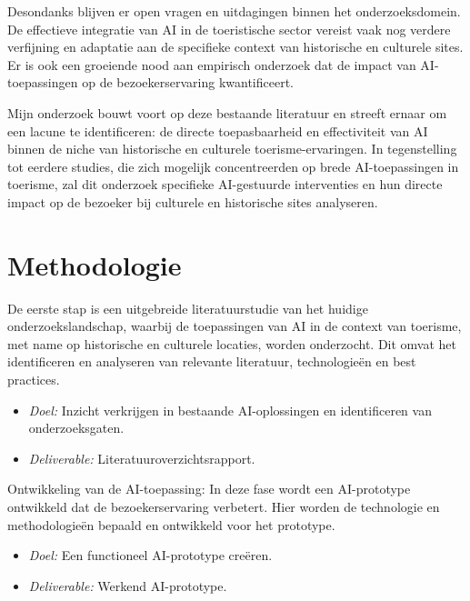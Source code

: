 Desondanks blijven er open vragen en uitdagingen binnen het onderzoeksdomein. De effectieve integratie van AI in de toeristische sector vereist vaak nog verdere verfijning en adaptatie aan de specifieke context van historische en culturele sites. Er is ook een groeiende nood aan empirisch onderzoek dat de impact van AI-toepassingen op de bezoekerservaring kwantificeert.

Mijn onderzoek bouwt voort op deze bestaande literatuur en streeft ernaar om een lacune te identificeren: de directe toepasbaarheid en effectiviteit van AI binnen de niche van historische en culturele toerisme-ervaringen. In tegenstelling tot eerdere studies, die zich mogelijk concentreerden op brede AI-toepassingen in toerisme, zal dit onderzoek specifieke AI-gestuurde interventies en hun directe impact op de bezoeker bij culturele en historische sites analyseren.



\section{Methodologie}%
\label{sec:methodologie}

De eerste stap is een uitgebreide literatuurstudie van het huidige onderzoekslandschap, waarbij de toepassingen van AI in de context van toerisme, met name op historische en culturele locaties, worden onderzocht. Dit omvat het identificeren en analyseren van relevante literatuur, technologieën en best practices.
\begin{itemize}
    \item \textit{Doel:} Inzicht verkrijgen in bestaande AI-oplossingen en identificeren van onderzoeksgaten.
    \item \textit{Deliverable:} Literatuuroverzichtsrapport.
\end{itemize}

Ontwikkeling van de AI-toepassing:
In deze fase wordt een AI-prototype ontwikkeld dat de bezoekerservaring verbetert. Hier worden de technologie en methodologieën bepaald en ontwikkeld voor het prototype.
\begin{itemize}
    \item \textit{Doel:} Een functioneel AI-prototype creëren.
    \item \textit{Deliverable:} Werkend AI-prototype.
\end{itemize}

